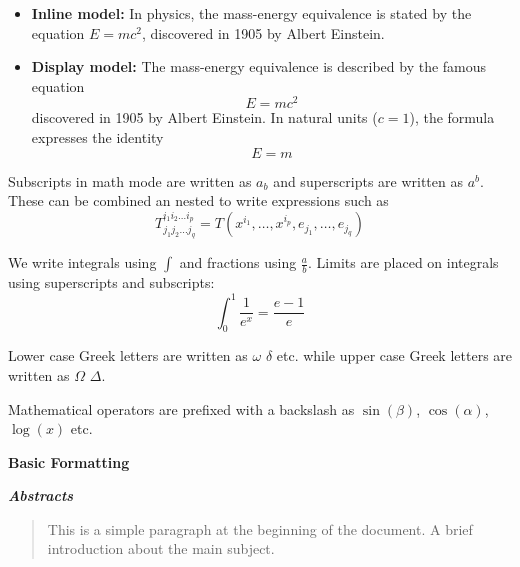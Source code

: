 \documentclass[12pt, letterpaper]{article}
\begin{document}
\begin{itemize}
	\item \textbf{Inline model:}
	In physics, the mass-energy equivalence is stated by the equation $E=mc^2$, discovered in 1905 by Albert Einstein.
	
	\item \textbf{Display model:} 
	The mass-energy equivalence is described by the famous equation
	$$E=mc^2$$
	discovered in 1905 by Albert Einstein. In natural units ($c = 1$), the formula expresses the identity
	\begin{equation}
		E=m
	\end{equation}
\end{itemize}

Subscripts in math mode are written as $a_b$ and superscripts are written as $a^b$.
These can be combined an nested to write expressions such as
$$T^{i_1 i_2 \dots i_p}_{j_1 j_2 \dots j_q} =
T(x^{i_1},\dots,x^{i_p},e_{j_1},\dots,e_{j_q})$$

We write integrals using $\int$ and fractions using $\frac{a}{b}$. Limits are placed on integrals using superscripts and subscripts:
$$\int_0^1 \frac{1}{e^x} = \frac{e-1}{e}$$

Lower case Greek letters are written as $\omega$ $\delta$ etc. while upper case Greek letters are written as $\Omega$ $\Delta$.

Mathematical operators are prefixed with a backslash as $\sin(\beta)$, $\cos(\alpha)$, $\log(x)$ etc.

\textbf{Basic Formatting}

\textbf{\textit{Abstracts}}
\begin{abstract}
This is a simple paragraph at the beginning of the document. A brief introduction about the main subject.
\end{abstract}
\end{document}
